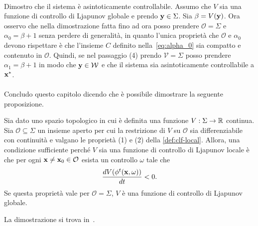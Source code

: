 \begin{steps}
    \hfill\qedsymbol\paragraph{}

    \item Dimostro che il sistema è asintoticamente controllabile.
    Assumo che $V$ sia una funzione di controllo di Ljapunov globale
    e prendo $\mathbf{y} \in \Sigma$.
    Sia $\beta = V(\mathbf{y})$.
    Ora osservo che nella dimostrazione fatta fino ad ora posso prendere
    $\mathcal O = \Sigma$ e $\alpha_0 = \beta + 1$
    senza perdere di generalità, in quanto l'unica proprietà che $\mathcal O$
    e $\alpha_0$ devono rispettare è che l'insieme $C$
    definito nella~\eqref{eq:alpha_0}
    sia compatto e contenuto in $\mathcal O$.
    Quindi, se nel passaggio (4) prendo $\mathcal V = \Sigma$
    posso prendere $\alpha_1 = \beta + 1$ in modo che
    $\mathbf{y} \in \mathcal{W}$ e che il sistema sia
    asintoticamente controllabile a $\mathbf{x}^*$.

    \hfill\qedsymbol\paragraph{}

\end{steps}

Concludo questo capitolo dicendo che è possibile
dimostrare la seguente proposizione.
\begin{prop}
    Sia dato uno spazio topologico in cui è 
    definita una funzione $V : \Sigma \to \mathbb{R}$ continua.
    Sia $\mathcal O \subseteq \Sigma$
    un insieme aperto per cui la restrizione di
    $V$ su $\mathcal O$ sia differenziabile con 
    continuità e valgano le proprietà (1) e (2) 
    della \autoref{def:clf-local}.
    Allora, una condizione sufficiente perché $V$
    sia una funzione di controllo di Ljapunov locale è che per ogni $\mathbf{x} \neq \mathbf{x}_0 \in \mathcal O$
    esista un controllo $\omega$ tale che
    \begin{equation*}
        \frac{dV(\phi^t(\mathbf{x}, \omega))}{dt} < 0.
    \end{equation*}
    Se questa proprietà vale per $\mathcal O = \Sigma$, $V$ è una funzione di controllo di Ljapunov globale. 
    \label{prop:condizione-sufficiente-ljapunov}
\end{prop}
La dimostrazione si trova in~\cite{sontagMath}.